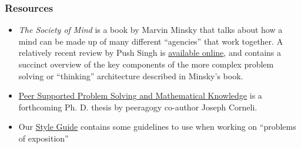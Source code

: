 \subsubsection{Resources}

\begin{itemize}
\item
  \emph{The Society of Mind} is a book by Marvin Minsky that talks about
  how a mind can be made up of many different ``agencies'' that work
  together. A relatively recent review by Push Singh is
  \href{http://web.media.mit.edu/~push/ExaminingSOM.html}{available
  online}, and contains a succinct overview of the key components of the
  more complex problem solving or ``thinking'' architecture described in
  Minsky's book.
\item
  \href{http://metameso.org/~joe/thesis-outline.html}{Peer Supported
  Problem Solving and Mathematical Knowledge} is a forthcoming Ph. D.
  thesis by peeragogy co-author Joseph Corneli.
\item
  Our \href{http://peeragogy.org/style-guide/}{Style Guide} contains
  some guidelines to use when working on ``problems of exposition''
\end{itemize}
